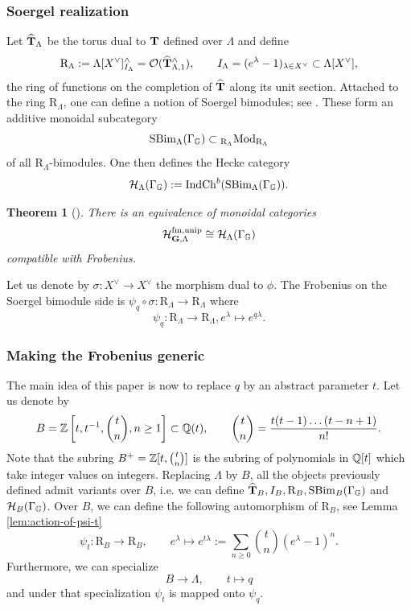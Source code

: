 \documentclass[a4paper, 10pt, oneside, reqno]{amsart}
\theoremstyle{plain}
\newtheorem{thm}{Theorem}[subsection]
\theoremstyle{definition}
\theoremstyle{remark}
\newcommand{\Gbb}{\mathbb{G}}
\newcommand{\RR}{\mathrm{R}}
\newcommand{\fm}{\mathrm{fm}}
\begin{document}
\subsubsection{Soergel realization}

Let $\widehat{\mathbf{T}}_{\Lambda}$ be the torus dual to $\mathbf{T}$ defined over $\Lambda$ and define 
$$\RR_{\Lambda} := \Lambda[X^{\vee}]^{\wedge}_{I_{\Lambda}} = \Ocal(\widehat{\Tbf}_{\Lambda, 1}^{\wedge}), \qquad I_{\Lambda} = (e^{\lambda} - 1)_{\lambda \in X^{\vee}} \subset \Lambda[X^{\vee}],$$
the ring of functions on the completion of $\widehat{\mathbf{T}}$ along its unit section. Attached to the ring $\RR_{\Lambda}$, one can define a notion of Soergel bimodules; see \cite{BezrukavnikovRiche}. These form an additive monoidal subcategory
$$\SBim_{\Lambda}(\Gamma_{\Gbb}) \subset {_{\RR_{\Lambda}}}\Mod_{\RR_{\Lambda}}$$ 
of all $\RR_{\Lambda}$-bimodules. One then defines the Hecke category  
$$\Hcal_{\Lambda}(\Gamma_{\Gbb}) := \Ind \Ch^b(\SBim_{\Lambda}(\Gamma_{\Gbb})).$$

\begin{thm}[\cite{BezrukavnikovRiche}]
There is an equivalence of monoidal categories
$$\Hcal^{\fm, \unip}_{\Gbf, \Lambda} \cong \Hcal_{\Lambda}(\Gamma_{\Gbb})$$
compatible with Frobenius. 
\end{thm}

Let us denote by $\sigma : X^{\vee} \to X^{\vee}$ the morphism dual to $\phi$. The Frobenius on the Soergel bimodule side is $\psi_q \circ \sigma : \RR_{\Lambda} \to \RR_{\Lambda}$ where 
$$\psi_q :  \RR_{\Lambda} \to \RR_{\Lambda}, e^{\lambda} \mapsto e^{q\lambda}.$$

\subsubsection{Making the Frobenius generic}

The main idea of this paper is now to replace $q$ by an abstract parameter $t$. Let us denote by 
$$B = \mathbb{Z}\left[t,t^{-1}, \binom{t}{n}, n \geq 1 \right] \subset \mathbb{Q}(t), \qquad \binom{t}{n} = \frac{t(t-1)\dots(t-n+1)}{n!}.$$
Note that the subring $B^+ = \mathbb{Z}[t, \binom{t}{n}]$ is the subring of polynomials in $\mathbb{Q}[t]$ which take integer values on integers. Replacing $\Lambda$ by $B$, all the objects previously defined admit variants over $B$, i.e. we can define $\widehat{\Tbf}_B, I_B, \RR_B, \SBim_B(\Gamma_{\Gbb})$ and $\Hcal_{B}(\Gamma_{\Gbb})$. Over $B$, we can define the following automorphism of $\RR_{B}$, see Lemma \ref{lem:action-of-psi-t}
$$\psi_t : \RR_{B} \to \RR_B, \qquad e^{\lambda} \mapsto e^{t\lambda} := \sum_{n \geq 0}\binom{t}{n}(e^{\lambda} - 1)^n.$$
Furthermore, we can specialize 
$$B \to \Lambda, \qquad t \mapsto q$$ 
and under that specialization $\psi_t$ is mapped onto $\psi_q$. 
\end{document}
